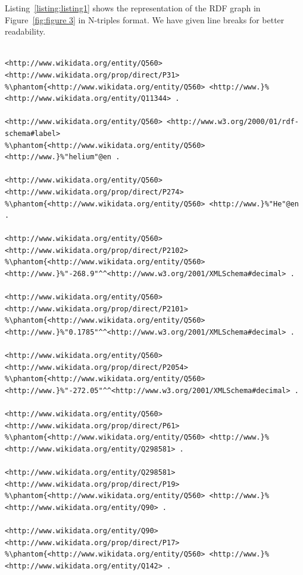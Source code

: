 Listing~\ref{listing:listing1} shows the representation of the RDF graph in Figure~\ref{fig:figure 3} in N-triples format. We have given line breaks for better readability.

\begin{minipage}{\linewidth}
\begin{lstlisting}[columns=fullflexible, label=listing:listing1, caption={RDF graph represented in N-triples syntax}, language=SPARQL]

<http://www.wikidata.org/entity/Q560> <http://www.wikidata.org/prop/direct/P31> 
%\phantom{<http://www.wikidata.org/entity/Q560> <http://www.}%<http://www.wikidata.org/entity/Q11344> .
		                                                
<http://www.wikidata.org/entity/Q560> <http://www.w3.org/2000/01/rdf-schema#label> 
%\phantom{<http://www.wikidata.org/entity/Q560> <http://www.}%"helium"@en .

<http://www.wikidata.org/entity/Q560> <http://www.wikidata.org/prop/direct/P274> 
%\phantom{<http://www.wikidata.org/entity/Q560> <http://www.}%"He"@en .

<http://www.wikidata.org/entity/Q560>  <http://www.wikidata.org/prop/direct/P2102> 
%\phantom{<http://www.wikidata.org/entity/Q560> <http://www.}%"-268.9"^^<http://www.w3.org/2001/XMLSchema#decimal> .

<http://www.wikidata.org/entity/Q560> <http://www.wikidata.org/prop/direct/P2101> 
%\phantom{<http://www.wikidata.org/entity/Q560> <http://www.}%"0.1785"^^<http://www.w3.org/2001/XMLSchema#decimal> .

<http://www.wikidata.org/entity/Q560> <http://www.wikidata.org/prop/direct/P2054> 
%\phantom{<http://www.wikidata.org/entity/Q560> <http://www.}%"-272.05"^^<http://www.w3.org/2001/XMLSchema#decimal> .

<http://www.wikidata.org/entity/Q560> <http://www.wikidata.org/prop/direct/P61> 
%\phantom{<http://www.wikidata.org/entity/Q560> <http://www.}%<http://www.wikidata.org/entity/Q298581> .

<http://www.wikidata.org/entity/Q298581> <http://www.wikidata.org/prop/direct/P19> 
%\phantom{<http://www.wikidata.org/entity/Q560> <http://www.}%<http://www.wikidata.org/entity/Q90> .

<http://www.wikidata.org/entity/Q90> <http://www.wikidata.org/prop/direct/P17> 
%\phantom{<http://www.wikidata.org/entity/Q560> <http://www.}%<http://www.wikidata.org/entity/Q142> . 

\end{lstlisting}
\end{minipage}

